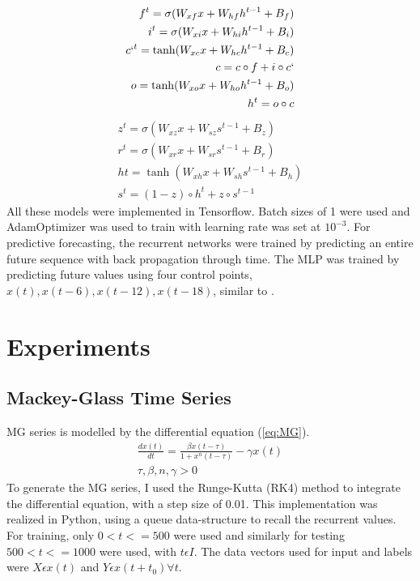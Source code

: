 \documentclass[11pt]{article}
\begin{document}
\begin{equation}
\begin{split}
f^{t} = \sigma(W_{xf}x + W_{hf}h^{t-1}+B_f) \\
i^{t} = \sigma(W_{xi}x + W_{hi}h^{t-1}+B_i) \\
c`^{t } = \tanh(W_{xc}x+W_{hc}h^{t-1}+B_c) \\
c = c \circ f + i \circ c` \\
o= \tanh (W_{xo}x + W_{ho}h^{t-1} + B_o) \\
h^{t} = o \circ c  \\
\end{split}
   \label{eq:LSTM_h}
\end{equation}
\begin{equation}
\begin{split}
  z^{t} = \sigma(W_{xz}x + W_{sz}s^{t-1} + B_z) \\
  r^{t} = \sigma(W_{xr}x + W_{sr}s^{t-1} + B_r) \\
  h{t} = \tanh(W_{xh}x + W_{sh}s^{t-1} + B_h) \\
  s^{t} = (1-z) \circ h^{t} + z \circ s^{t-1} 
  \end{split}
  \label{eq:GRU_h}
\end{equation}
All these models were implemented in Tensorflow. Batch sizes of 1 were
used and AdamOptimizer \cite{adam} was used to train with learning rate
was set at $10^{-3}$. For predictive forecasting, the recurrent networks
were trained by predicting an entire future sequence with back propagation through
time. The MLP was trained by predicting future values using four
control points, $x(t), x(t-6), x(t-12), x(t-18)$, similar to \cite{tr}.

  \section {Experiments}
\subsection {Mackey-Glass Time Series}
MG series is modelled by the differential equation (\ref{eq:MG}).
\begin{equation}
  \begin{split}
\frac{dx(t)}{dt} = \frac{\beta x(t-\tau)}{1+x^n(t- \tau)} - \gamma x(t)\\
\tau,\beta,n,\gamma > 0
\label{eq:MG}
  \end{split}
\end{equation}
To generate the MG series, I used the Runge-Kutta (RK4) method to
integrate the differential equation, with a step size of
0.01. This implementation was realized in Python, using a queue
data-structure to recall the recurrent values. For training, only
$0<t<=500$ were used and similarly for testing 
$500<t<=1000$  were used, with $t \epsilon I$. The data vectors used
for input and labels were $X \epsilon x(t) $ and $ Y \epsilon x(t+t_0) \forall
t$. 
\end{document}
